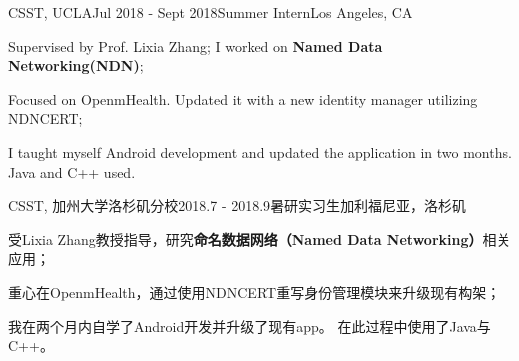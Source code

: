 \ifx\lang\eng
	\begin{rSubsection}{CSST, UCLA}{Jul 2018 - Sept 2018}{Summer Intern}{Los Angeles, CA}
		\item Supervised by Prof. Lixia Zhang; I worked on \textbf{Named Data Networking(NDN)};
		\item Focused on OpenmHealth. Updated it with a new identity manager utilizing NDNCERT;
		\item I taught myself Android development and updated the application in two months. Java and C++ used.
	\end{rSubsection}
\else
	\begin{rSubsection}{CSST, 加州大学洛杉矶分校}{2018.7 - 2018.9}{暑研实习生}{加利福尼亚，洛杉矶}
		\item 受Lixia Zhang教授指导，研究\textbf{命名数据网络（Named Data Networking）}相关应用；
		\item 重心在OpenmHealth，通过使用NDNCERT重写身份管理模块来升级现有构架；
		\item 我在两个月内自学了Android开发并升级了现有app。 在此过程中使用了Java与C++。
	\end{rSubsection}
\fi